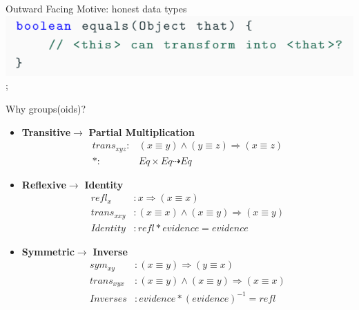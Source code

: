 \documentclass{beamer}
\begin{document}
\begin{frame}{Outward Facing Motive: honest data types}
{\includegraphics{equals.png}
};
\end{frame}


\begin{frame}{Why groups(oids)?}
\begin{itemize}
    \item \textbf{Transitive}$\to$ \textbf{Partial Multiplication}
    \begin{align*}
    trans_{xyz}:& (x\equiv y) \wedge (y\equiv z) \Rightarrow (x\equiv z)\\
    *:& Eq \times Eq \dashrightarrow Eq
    \end{align*}
\pause

\item  \textbf{Reflexive}$\to$ \textbf{Identity}
    \begin{align*}
    refl_x&: x \Rightarrow  (x\equiv x)\\
    trans_{xxy} &:(x\equiv x)\wedge (x\equiv y) \Rightarrow (x\equiv y)\\
    \hline
    Identity &: refl*evidence  = evidence
    \end{align*}

    \pause
    \item  \textbf{Symmetric}$\to$ \textbf{Inverse}
    \begin{align*}
    sym_{xy}&:(x\equiv y)\Rightarrow (y\equiv x)\\
    trans_{xyx} &: (x\equiv y) \wedge (x\equiv y)  \Rightarrow (x\equiv x)\\
    \hline
    Inverses & : evidence * (evidence)^{-1}  = refl
    \end{align*}
\end{itemize}
\end{frame}
    
\end{document}
